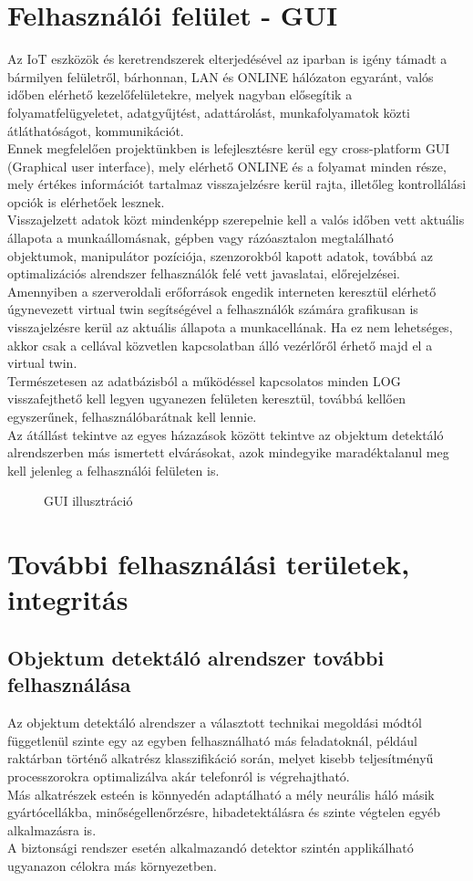 \documentclass{article}
\begin{document}
\section{Felhasználói felület - GUI}
Az IoT eszközök és keretrendszerek elterjedésével az iparban is igény támadt a bármilyen felületről, bárhonnan, LAN és ONLINE hálózaton egyaránt, valós időben elérhető kezelőfelületekre, melyek nagyban elősegítik a folyamatfelügyeletet, adatgyűjtést, adattárolást, munkafolyamatok közti átláthatóságot, kommunikációt.\\
Ennek megfelelően projektünkben is lefejlesztésre kerül egy cross-platform GUI (Graphical user interface), mely elérhető ONLINE és a folyamat minden része, mely értékes információt tartalmaz visszajelzésre kerül rajta, illetőleg kontrollálási opciók is elérhetőek lesznek.\\
Visszajelzett adatok közt mindenképp szerepelnie kell a valós időben vett aktuális állapota a munkaállomásnak, gépben vagy rázóasztalon megtalálható objektumok, manipulátor pozíciója, szenzorokból kapott adatok, továbbá az optimalizációs alrendszer felhasználók felé vett javaslatai, előrejelzései.\\
Amennyiben a szerveroldali erőforrások engedik interneten keresztül elérhető úgynevezett virtual twin segítségével a felhasználók számára grafikusan is visszajelzésre kerül az aktuális állapota a munkacellának. Ha ez nem lehetséges, akkor csak a cellával közvetlen kapcsolatban álló vezérlőről érhető majd el a virtual twin.\\
Természetesen az adatbázisból a működéssel kapcsolatos minden LOG visszafejthető kell legyen ugyanezen felületen keresztül, továbbá kellően egyszerűnek, felhasználóbarátnak kell lennie.\\
Az átállást tekintve az egyes házazások között tekintve az objektum detektáló alrendszerben más ismertett elvárásokat, azok mindegyike maradéktalanul meg kell jelenleg a felhasználói felületen is.\\
\begin{figure}[h]
    \caption{GUI illusztráció}
\end{figure}

\newpage
\section{További felhasználási területek, integritás}
\subsection{Objektum detektáló alrendszer további felhasználása}
Az objektum detektáló alrendszer a választott technikai megoldási módtól függetlenül szinte egy az egyben felhasználható más feladatoknál, például raktárban történő alkatrész klasszifikáció során, melyet kisebb teljesítményű processzorokra optimalizálva akár telefonról is végrehajtható.\\
Más alkatrészek esteén is könnyedén adaptálható a mély neurális háló másik gyártócellákba, minőségellenőrzésre, hibadetektálásra és szinte végtelen egyéb alkalmazásra is.\\
A biztonsági rendszer esetén alkalmazandó detektor szintén applikálható ugyanazon célokra más környezetben.
\end{document}
